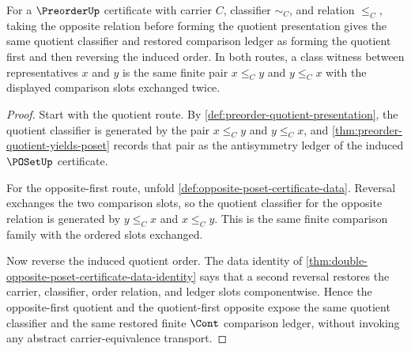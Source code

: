 \begin{theorem}
\label{thm:poset-opposite-quotient-compatibility}
For a $\PreorderUp$ certificate with carrier $C$, classifier $\sim_C$, and
relation $\le_C$, taking the opposite relation before forming the quotient
presentation gives the same quotient classifier and restored comparison ledger
as forming the quotient first and then reversing the induced order. In both
routes, a class witness between representatives $x$ and $y$ is the same finite
pair $x\le_C y$ and $y\le_C x$ with the displayed comparison slots exchanged
twice.
\end{theorem}
\begin{proof}
Start with the quotient route. By
\autoref{def:preorder-quotient-presentation}, the quotient classifier is
generated by the pair $x\le_C y$ and $y\le_C x$, and
\autoref{thm:preorder-quotient-yields-poset} records that pair as the
antisymmetry ledger of the induced $\POSetUp$ certificate.

For the opposite-first route, unfold
\autoref{def:opposite-poset-certificate-data}. Reversal exchanges the two
comparison slots, so the quotient classifier for the opposite relation is
generated by $y\le_C x$ and $x\le_C y$. This is the same finite comparison
family with the ordered slots exchanged.

Now reverse the induced quotient order. The data identity of
\autoref{thm:double-opposite-poset-certificate-data-identity} says that a
second reversal restores the carrier, classifier, order relation, and ledger
slots componentwise. Hence the opposite-first quotient and the quotient-first
opposite expose the same quotient classifier and the same restored finite
$\Cont$ comparison ledger, without invoking any abstract carrier-equivalence
transport.
\end{proof}

